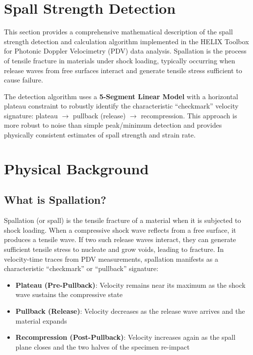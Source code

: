 
\section{Spall Strength Detection}
This section provides a comprehensive mathematical description of the spall strength detection and calculation algorithm implemented in the HELIX Toolbox for Photonic Doppler Velocimetry (PDV) data analysis. Spallation is the process of tensile fracture in materials under shock loading, typically occurring when release waves from free surfaces interact and generate tensile stress sufficient to cause failure.

The detection algorithm uses a \textbf{5-Segment Linear Model} with a horizontal plateau constraint to robustly identify the characteristic ``checkmark'' velocity signature: plateau $\rightarrow$ pullback (release) $\rightarrow$ recompression. This approach is more robust to noise than simple peak/minimum detection and provides physically consistent estimates of spall strength and strain rate.

\section{Physical Background}

\subsection{What is Spallation?}
Spallation (or spall) is the tensile fracture of a material when it is subjected to shock loading. When a compressive shock wave reflects from a free surface, it produces a tensile wave. If two such release waves interact, they can generate sufficient tensile stress to nucleate and grow voids, leading to fracture. In velocity-time traces from PDV measurements, spallation manifests as a characteristic ``checkmark'' or ``pullback'' signature:

\begin{itemize}
    \item \textbf{Plateau (Pre-Pullback)}: Velocity remains near its maximum as the shock wave sustains the compressive state
    \item \textbf{Pullback (Release)}: Velocity decreases as the release wave arrives and the material expands
    \item \textbf{Recompression (Post-Pullback)}: Velocity increases again as the spall plane closes and the two halves of the specimen re-impact
\end{itemize}

